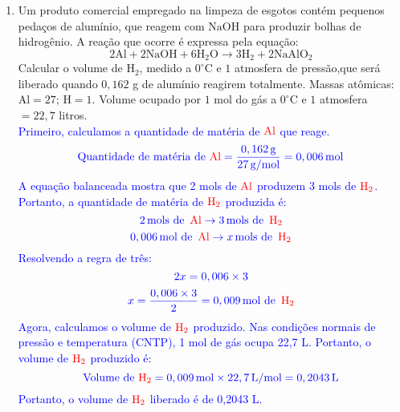\documentclass[a4paper, 12pt]{article}
\begin{document}
\begin{enumerate}
    \item Um produto comercial empregado na limpeza de esgotos contém pequenos pedaços
          de alumínio, que reagem com $\text{NaOH}$ para produzir bolhas de
          hidrogênio. A reação que ocorre é expressa pela equação:
          \[
              2\text{Al}+ 2\text{NaOH}+ 6\text{H}_{2}\text{O}\rightarrow 3\text{H}_{2}
              + 2\text{NaAlO}_{2}
          \]
          Calcular o volume de $\text{H}_{2}$, medido a $0^{\circ}$C e $1$ atmosfera
          de pressão,que será liberado quando $0,162$ g de alumínio reagirem totalmente.
          Massas atômicas: $\text{Al}= 27$; $\text{H}= 1$. Volume ocupado por $1$ mol
          do gás a $0^{\circ}$C e $1$ atmosfera $= 22,7$ litros.
          \\[20pt]
          \textcolor{blue}{Primeiro, calculamos a quantidade de matéria de \(\textcolor{red}{\text{Al}}\) que reage.}
          \[
              \textcolor{blue}{\text{Quantidade de matéria de } \textcolor{red}{\text{Al}} = \frac{0,162 \, \text{g}}{27 \, \text{g/mol}} = 0,006 \, \text{mol}}
          \]
          \textcolor{blue}{A equação balanceada mostra que 2 mols de \(\textcolor{red}{\text{Al}}\) produzem 3 mols de \(\textcolor{red}{\text{H}_2}\). Portanto, a quantidade de matéria de \(\textcolor{red}{\text{H}_2}\) produzida é:}
          \[
              \textcolor{blue}{2 \, \text{mols de } \, \textcolor{red}{\text{Al}} \rightarrow 3 \, \text{mols de } \, \textcolor{red}{\text{H}_2}}
          \]
          \[
              \textcolor{blue}{0,006 \, \text{mol de } \, \textcolor{red}{\text{Al}} \rightarrow x \, \text{mols de } \, \textcolor{red}{\text{H}_2}}
          \]
          \textcolor{blue}{Resolvendo a regra de três:}
          \[
              \textcolor{blue}{2x = 0,006 \times 3}
          \]
          \[
              \textcolor{blue}{x = \frac{0,006 \times 3}{2} = 0,009 \, \text{mol de } \, \textcolor{red}{\text{H}_2}}
          \]
          \textcolor{blue}{Agora, calculamos o volume de \(\textcolor{red}{\text{H}_2}\) produzido. Nas condições normais de pressão e temperatura (CNTP), 1 mol de gás ocupa 22,7 L. Portanto, o volume de \(\textcolor{red}{\text{H}_2}\) produzido é:}
          \[
              \textcolor{blue}{\text{Volume de } \textcolor{red}{\text{H}_2} = 0,009 \, \text{mol} \times 22,7 \, \text{L/mol} = 0,2043 \, \text{L}}
          \]
          \textcolor{blue}{Portanto, o volume de \(\textcolor{red}{\text{H}_2}\) liberado é de 0,2043 L.}


\end{enumerate}
\end{document}
